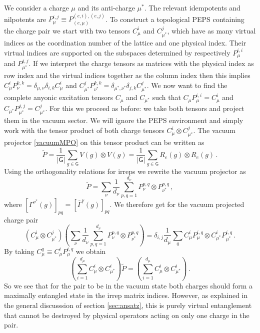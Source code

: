 \documentclass[12 pt]{article}
\begin{document}
We consider a charge $\mu$ and its anti-charge $\mu^*$. The relevant idempotents and nilpotents are $P_{\mu}^{i,j} \equiv P_{(e,\mu)}^{(e,i),(e,j)}$. To construct a topological PEPS containing the charge pair we start with two tensors $C^i_\mu$ and $C^j_{\mu^*}$, which have as many virtual indices as the coordination number of the lattice and one physical index. Their virtual indices are supported on the subspaces determined by respectively $P_\mu^{i,i}$ and $P_{\mu^*}^{j,j}$. If we interpret the charge tensors as matrices with the physical index as row index and the virtual indices together as the column index then this implies $C^i_\mu P^{k,k}_\nu = \delta_{\mu,\nu}\delta_{i,k}C^i_\mu$ and $C^j_{\mu^*} P^{k,k}_{\nu^*} = \delta_{\mu^*,\nu^*}\delta_{j,k} C^j_{\mu^*}$. We now want to find the complete anyonic excitation tensors $C_\mu$ and $C_{\mu^*}$ such that $C_\mu P_\mu^{i,i} = C_\mu^i$ and $C_{\mu^*}P_{\mu^*}^{j,j} = C^j_{\mu^*}$. For this we proceed as before: we take both tensors and project them in the vacuum sector. We will ignore the PEPS environment and simply work with the tensor product of both charge tensors $C_\mu^i\otimes C_{\mu^*}^j$. The vacuum projector \eqref{vacuumMPO} on this tensor product can be written as
\begin{equation}
\tilde{P} = \frac{1}{|\mathsf{G}|}\sum_{g\in \mathsf{G}} V(g)\otimes V(g) = \frac{1}{|\mathsf{G}|}\sum_{g\in \mathsf{G}} R_e(g)\otimes R_e(g)\, .
\end{equation}
Using the orthogonality relations for irreps we rewrite the vacuum projector as
\begin{equation}
\tilde{P} = \sum_{\nu}\frac{1}{d_\nu}\sum_{p,q=1}^{d_\nu}P^{p,q}_\nu\otimes P^{p,q}_{\nu^*}\, ,
\end{equation}
where $[\Gamma^{\nu^*}(g)]_{pq} = [\bar{\Gamma}^\nu(g)]_{pq}$. We therefore get for the vacuum projected charge pair
\begin{equation}
\left(C_\mu^i\otimes C_{\mu^*}^j\right)\left( \sum_{\nu}\frac{1}{d_\nu}\sum_{p,q=1}^{d_\nu}P^{p,q}_\nu\otimes P^{p,q}_{\nu^*}\right) = \delta_{i,j}\frac{1}{d_\mu}\sum_q C_\mu^i P_\mu^{i,q}\otimes C_{\mu^*}^i P_{\mu^*}^{i,q}\, .
\end{equation}
By taking $C_\mu^q \equiv C_\mu^i P_\mu^{i,q}$ we obtain
\begin{equation}
\left(\sum_{i = 1}^{d_\mu}C_\mu^i\otimes C_{\mu^*}^i\right)\tilde{P} = \left(\sum_{i = 1}^{d_\mu}C_\mu^i\otimes C_{\mu^*}^i\right)\, .
\end{equation}
So we see that for the pair to be in the vacuum state both charges should form a maximally entangled state in the irrep matrix indices. However, as explained in the general discusssion of section \ref{sec:ansatz}, this is purely virtual entanglement that cannot be destroyed by physical operators acting on only one charge in the pair.
\end{document}
